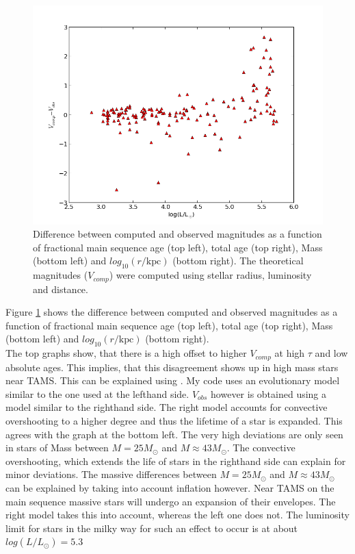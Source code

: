 \documentclass[a4paper,10pt]{article}
\begin{document}
\begin{figure}[h!]
\begin{minipage}{0.49\textwidth}
  \end{minipage}
  \begin{minipage}{0.49\textwidth}
   \includegraphics[width=\textwidth]{diffmaglogL}
  \end{minipage}
 \caption{Difference between computed and observed magnitudes as a function of fractional main sequence age (top left), total age
 (top right), Mass (bottom left) and $log_{10}(r/\mathrm{kpc})$ (bottom right). 
 The theoretical magnitudes ($V_{comp}$) were computed using stellar radius, luminosity and distance.\label{diffmag}}
 \end{figure}
 
 Figure \ref{diffmag} shows the difference between computed and observed magnitudes as a function of fractional main sequence age (top left),
 total age (top right), Mass (bottom left) and $log_{10}(r/\mathrm{kpc})$ (bottom right). \\
 The top graphs show, that there is a high offset to higher $V_{comp}$ at high $\tau$ and low absolute ages. This implies, that this 
 disagreement shows up in high mass stars near TAMS. This can be explained using \citep[figure 1]{2014A&A...570L..13C}. My code uses
 an evolutionary model similar to the one used at the lefthand side. $V_{obs}$ however is obtained using a model similar to the righthand
 side. The right model accounts for convective overshooting to a higher degree and thus the lifetime of a star is expanded. This agrees
 with the graph at the bottom left. The very high deviations are only seen in stars of Mass between $M=25M_\odot$ and $M\approx43M_\odot$.
 The convective overshooting, which extends the life of stars in the righthand side can explain for minor deviations. The massive differences
 between $M=25M_\odot$ and $M\approx 43M_\odot$ can be explained by taking into account inflation however. Near TAMS on the
 main sequence massive stars will undergo an expansion of their envelopes. The right model takes this into account, whereas the left one 
 does not. The luminosity limit for stars in the milky way for such an effect to occur is at about $log(L/L_\odot)=5.3$ 
 
\end{document}
